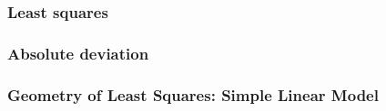 \documentclass[handout]{beamer}
\begin{document}


   \begin{frame}
   \frametitle{Least squares}
   \begin{center}
   \end{center}

   \end{frame}



   \begin{frame}
   \frametitle{Absolute deviation}
   \begin{center}
   \end{center}

   \end{frame}


   \begin{frame} \frametitle{Geometry of Least Squares: Simple Linear Model}

   \end{frame}

\end{document}
